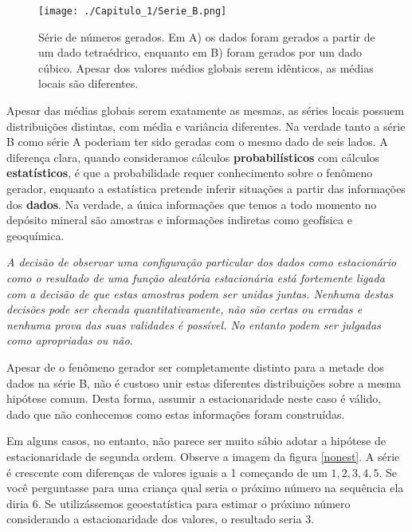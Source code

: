 \FloatBarrier
\begin{figure}[!htb]
	\centering
	\texttt{[image: ./Capitulo\_1/Serie\_B.png]}	
	\caption{Série de números gerados. Em A) os dados foram gerados a partir de um dado tetraédrico, enquanto em B) foram gerados por um dado cúbico. Apesar dos valores médios globais serem idênticos, as médias locais são diferentes.} 
	\label{SerieB}
\end{figure}
\FloatBarrier

Apesar das médias globais serem exatamente as mesmas, as séries locais possuem distribuições distintas, com média e variância diferentes. Na verdade tanto a série B como série A poderiam ter sido geradas com o mesmo dado de seis lados. A diferença clara, quando consideramos cálculos \textbf{probabilísticos} com cálculos \textbf{estatísticos}, é que a probabilidade requer conhecimento sobre o fenômeno gerador, enquanto a estatística pretende inferir situações a partir das informações dos \textbf{dados}. Na verdade, a única informações que temos a todo momento no depósito mineral são amostras e informações indiretas como geofísica e geoquímica. 

\begin{remark}
	\textit{A decisão de observar uma configuração particular dos dados como estacionário como o resultado de uma função aleatória estacionária está fortemente ligada com a decisão de que estas amostras podem ser unidas juntas. Nenhuma destas decisões pode ser checada quantitativamente, não são certas ou erradas e nenhuma prova das suas validades é possível. No entanto podem ser julgadas como apropriadas ou não.} \citet{isaaks1989applied}
\end{remark}

Apesar de o fenômeno gerador ser completamente distinto para a metade dos dados na série B, não é custoso unir estas diferentes distribuições sobre a mesma hipótese comum. Desta forma, assumir a estacionaridade neste caso é válido, dado que não conhecemos como estas informações foram construídas. 

Em alguns casos, no entanto, não parece ser muito sábio adotar a hipótese de estacionaridade de segunda ordem. Observe a imagem da figura \ref{nonest}. A série é crescente com diferenças de valores iguais a 1 começando de um ${1,2,3,4,5}$. Se você perguntasse para uma criança qual seria o próximo número na sequência ela diria $6$. Se utilizássemos geoestatística para estimar o próximo número considerando a estacionaridade dos valores, o resultado seria $3$.  

